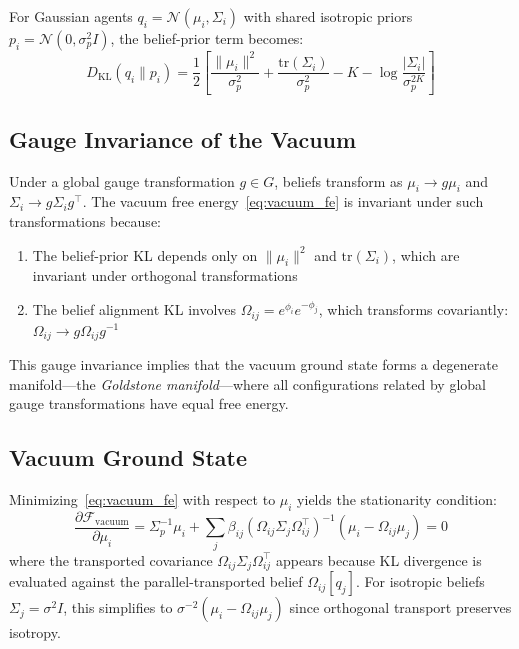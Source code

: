 \documentclass[twoside,11pt]{article}
\begin{document}
For Gaussian agents $q_i = \mathcal{N}(\mu_i, \Sigma_i)$ with shared isotropic priors $p_i = \mathcal{N}(0, \sigma_p^2 I)$, the belief-prior term becomes:
\begin{equation}
D_{\mathrm{KL}}(q_i \| p_i) = \frac{1}{2}\left[\frac{\|\mu_i\|^2}{\sigma_p^2} + \frac{\mathrm{tr}(\Sigma_i)}{\sigma_p^2} - K - \log\frac{|\Sigma_i|}{\sigma_p^{2K}}\right]
\end{equation}

\subsection{Gauge Invariance of the Vacuum}

Under a global gauge transformation $g \in G$, beliefs transform as $\mu_i \to g\mu_i$ and $\Sigma_i \to g\Sigma_i g^\top$. The vacuum free energy~\eqref{eq:vacuum_fe} is invariant under such transformations because:

\begin{enumerate}
    \item The belief-prior KL depends only on $\|\mu_i\|^2$ and $\mathrm{tr}(\Sigma_i)$, which are invariant under orthogonal transformations
    \item The belief alignment KL involves $\Omega_{ij} = e^{\phi_i}e^{-\phi_j}$, which transforms covariantly: $\Omega_{ij} \to g\Omega_{ij}g^{-1}$
\end{enumerate}

This gauge invariance implies that the vacuum ground state forms a degenerate manifold---the \emph{Goldstone manifold}---where all configurations related by global gauge transformations have equal free energy.

\subsection{Vacuum Ground State}

Minimizing~\eqref{eq:vacuum_fe} with respect to $\mu_i$ yields the stationarity condition:
\begin{equation}
\frac{\partial \mathcal{F}_{\text{vacuum}}}{\partial \mu_i} = \Sigma_p^{-1}\mu_i + \sum_j \beta_{ij} (\Omega_{ij}\Sigma_j\Omega_{ij}^\top)^{-1}(\mu_i - \Omega_{ij}\mu_j) = 0
\end{equation}
where the transported covariance $\Omega_{ij}\Sigma_j\Omega_{ij}^\top$ appears because KL divergence is evaluated against the parallel-transported belief $\Omega_{ij}[q_j]$. For isotropic beliefs $\Sigma_j = \sigma^2 I$, this simplifies to $\sigma^{-2}(\mu_i - \Omega_{ij}\mu_j)$ since orthogonal transport preserves isotropy.
\end{document}
